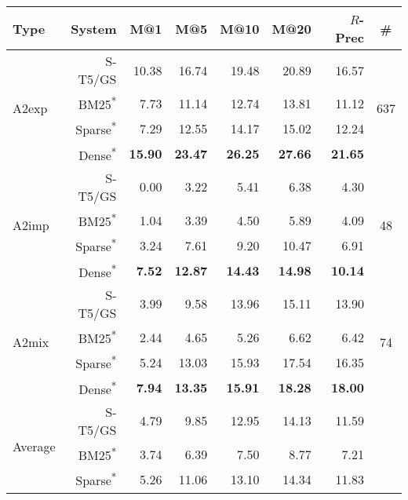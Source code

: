 \documentclass[11pt]{article}
\begin{document}
\begin{table*}[]
    \centering
    \begin{tabular}{l|r|r|r|r|r|r|c}
     Type &  System &  M@1 &  M@5 &  M@10 &  M@20 &  $R$-Prec &  \# \\
    \hline
    \hline
    \multirow{4}{2em}{A2exp} &    S-T5/GS &  10.38 &  16.74 &   19.48 &   20.89 &        16.57 &      \multirow{4}{2em}{637} \\
     &    BM25\textsuperscript{*} &   7.73 &  11.14 &   12.74 &   13.81 &        11.12 &       \\
     &    Sparse\textsuperscript{*} &   7.29 &  12.55 &   14.17 &   15.02 &        12.24 &       \\
     &    Dense\textsuperscript{*} &  \textbf{15.90} &  \textbf{23.47} &   \textbf{26.25} &   \textbf{27.66} &        \textbf{21.65} &       \\
    \hline
    \multirow{4}{2em}{A2imp} &    S-T5/GS &   0.00 &   3.22 &    5.41 &    6.38 &         4.30 &       \multirow{4}{2em}{48} \\
     &    BM25\textsuperscript{*} &   1.04 &   3.39 &    4.50 &    5.89 &         4.09 &        \\
     &    Sparse\textsuperscript{*} &   3.24 &   7.61 &    9.20 &   10.47 &         6.91 &        \\
     &    Dense\textsuperscript{*} &   \textbf{7.52} &  \textbf{12.87} &   \textbf{14.43} &   \textbf{14.98} &        \textbf{10.14} &        \\
    \hline
    \multirow{4}{3em}{A2mix} &    S-T5/GS &   3.99 &   9.58 &   13.96 &   15.11 &        13.90 &       \multirow{4}{2em}{74} \\
     &    BM25\textsuperscript{*} &   2.44 &   4.65 &    5.26 &    6.62 &         6.42 &        \\
     &    Sparse\textsuperscript{*} &   5.24 &  13.03 &   15.93 &   17.54 &        16.35 &        \\
     &    Dense\textsuperscript{*} &   \textbf{7.94} &  \textbf{13.35} &   \textbf{15.91} &   \textbf{18.28} &        \textbf{18.00} &        \\
    \hline
    \hline
     \multirow{4}{2em}{Average} &    S-T5/GS &   4.79 &   9.85 &   12.95 &   14.13 &        11.59 &         \\
      &    BM25\textsuperscript{*} &   3.74 &   6.39 &    7.50 &    8.77 &         7.21 &          \\
      &    Sparse\textsuperscript{*} &   5.26 &  11.06 &   13.10 &   14.34 &        11.83 &         \\

\end{tabular}
\end{table*}
\end{document}
